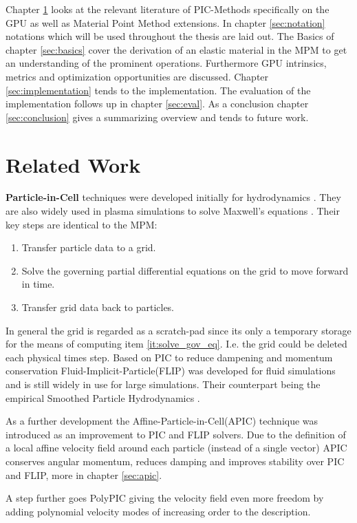 \documentclass[m,times]{cgMA}
\begin{document}
Chapter \ref{sec:rel_work} looks at the relevant literature of PIC-Methods specifically on the GPU as well as Material Point Method extensions. In chapter \ref{sec:notation} notations which will be used throughout the thesis are laid out. The Basics of chapter \ref{sec:basics} cover the derivation of an elastic material in the MPM to get an understanding of the prominent operations. Furthermore GPU intrinsics, metrics and optimization opportunities are discussed. Chapter \ref{sec:implementation} tends to the implementation. The evaluation of the implementation follows up in chapter \ref{sec:eval}. As a conclusion chapter \ref{sec:conclusion} gives a summarizing overview and tends to future work.

\clearpage
\section{Related Work}\label{sec:rel_work}
\textbf{Particle-in-Cell} techniques were developed initially for hydrodynamics \cite{evans1957particle}. They are also widely used in plasma simulations to solve Maxwell's equations \cite{PIC:GPU}. Their key steps are identical to the MPM:
\begin{enumerate}
  \item Transfer particle data to a grid.
\item \label{it:solve_gov_eq}Solve the governing partial differential equations on the grid to move forward in time.
  \item Transfer grid data back to particles.
\end{enumerate}
In general the grid is regarded as a scratch-pad since its only a temporary storage for the means of computing item \ref{it:solve_gov_eq}. I.e. the grid could be deleted each physical times step. Based on PIC to reduce dampening and momentum conservation Fluid-Implicit-Particle(FLIP) was developed for fluid simulations and is still widely in use for large simulations. Their counterpart being the empirical Smoothed Particle Hydrodynamics \cite{gingold1977smoothed}.

As a further development the Affine-Particle-in-Cell(APIC) technique was introduced as an improvement to PIC and FLIP solvers. Due to the definition of a local affine velocity field around each particle (instead of a single vector) APIC conserves angular momentum, reduces damping and improves stability over PIC and FLIP, more in chapter \ref{sec:apic}. \cite{MPM:APIC} \cite{MPM:OLD_APIC}

A step further goes PolyPIC giving the velocity field even more freedom by adding polynomial velocity modes of increasing order to the description. \cite{MPM:POLYPIC}
\end{document}
